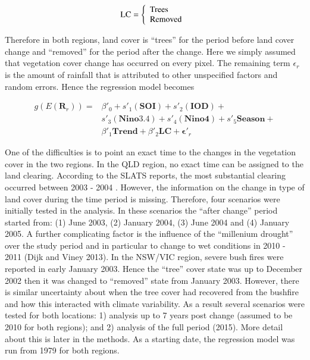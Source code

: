 \documentclass[]{elsarticle} %
\theoremstyle{definition}
\theoremstyle{definition}
\theoremstyle{definition}
\theoremstyle{remark}
\begin{document}
\begin{equation}
  \mbox{LC} = \left\{
  \begin{array}{ll}
     \mbox{Trees} \\
     \mbox{Removed}
  \end{array} \right.\\
  \label{eq:dummyC}
\end{equation}

Therefore in both regions, land cover is ``trees'' for the period before
land cover change and ``removed'' for the period after the change. Here
we simply assumed that vegetation cover change has occurred on every
pixel. The remaining term \(\epsilon_r\) is the amount of rainfall that
is attributed to other unspecified factors and random errors. Hence the
regression model becomes \vspace{0.5cm}

\begin{equation}
\begin{array}{lll}
g(E(\mathbf{R}_r)) = &\beta'_0 + s'_1(\mathbf{SOI}) + s'_2(\mathbf{IOD}) + \\
  &s'_3(\mathbf{Nino3.4}) + s'_4(\mathbf{Nino4}) + s'_5\mathbf{Season} + \\
  &\beta'_1\mathbf{Trend} + \beta'_2\mathbf{LC} + \boldsymbol{\epsilon'}_r
\end{array}
  \label{eq:model2}
\end{equation}

One of the difficulties is to point an exact time to the changes in the
vegetation cover in the two regions. In the QLD region, no exact time
can be assigned to the land clearing. According to the SLATS reports,
the most substantial clearing occurred between 2003 - 2004 . However,
the information on the change in type of land cover during the time
period is missing. Therefore, four scenarios were initially tested in
the analysis. In these scenarios the ``after change'' period started
from: (1) June 2003, (2) January 2004, (3) June 2004 and (4) January
2005. A further complicating factor is the influence of the ``millenium
drought'' over the study period and in particular to change to wet
conditions in 2010 - 2011 (Dijk and Viney 2013). In the NSW/VIC region,
severe bush fires were reported in early January 2003. Hence the
``tree'' cover state was up to December 2002 then it was changed to
``removed'' state from January 2003. However, there is similar
uncertainty about when the tree cover had recovered from the bushfire
and how this interacted with climate variability. As a result several
scenarios were tested for both locations: 1) analysis up to 7 years post
change (assumed to be 2010 for both regions); and 2) analysis of the
full period (2015). More detail about this is later in the methods. As a
starting date, the regression model was run from 1979 for both regions.
\end{document}

